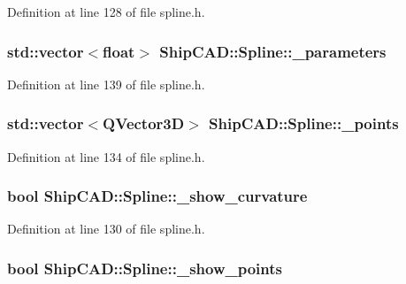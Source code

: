 Definition at line 128 of file spline.\-h.

\hypertarget{classShipCAD_1_1Spline_a374180992c17d3ee4b869d45080529fc}{
\subsubsection[{\-\_\-parameters}]{\setlength{\rightskip}{0pt plus 5cm}std\-::vector$<$float$>$ Ship\-C\-A\-D\-::\-Spline\-::\-\_\-parameters\hspace{0.3cm}{\ttfamily [protected]}}}\label{classShipCAD_1_1Spline_a374180992c17d3ee4b869d45080529fc}


Definition at line 139 of file spline.\-h.

\hypertarget{classShipCAD_1_1Spline_a6288af72f907a160974b7ce5207316ec}{
\subsubsection[{\-\_\-points}]{\setlength{\rightskip}{0pt plus 5cm}std\-::vector$<$Q\-Vector3\-D$>$ Ship\-C\-A\-D\-::\-Spline\-::\-\_\-points\hspace{0.3cm}{\ttfamily [protected]}}}\label{classShipCAD_1_1Spline_a6288af72f907a160974b7ce5207316ec}


Definition at line 134 of file spline.\-h.

\hypertarget{classShipCAD_1_1Spline_a5b5ebff933cd6fc2d59e0412bf342591}{
\subsubsection[{\-\_\-show\-\_\-curvature}]{\setlength{\rightskip}{0pt plus 5cm}bool Ship\-C\-A\-D\-::\-Spline\-::\-\_\-show\-\_\-curvature\hspace{0.3cm}{\ttfamily [protected]}}}\label{classShipCAD_1_1Spline_a5b5ebff933cd6fc2d59e0412bf342591}


Definition at line 130 of file spline.\-h.

\hypertarget{classShipCAD_1_1Spline_af850b71f44eaced42ede035d73cb4271}{
\subsubsection[{\-\_\-show\-\_\-points}]{\setlength{\rightskip}{0pt plus 5cm}bool Ship\-C\-A\-D\-::\-Spline\-::\-\_\-show\-\_\-points\hspace{0.3cm}{\ttfamily [protected]}}}\label{classShipCAD_1_1Spline_af850b71f44eaced42ede035d73cb4271}


